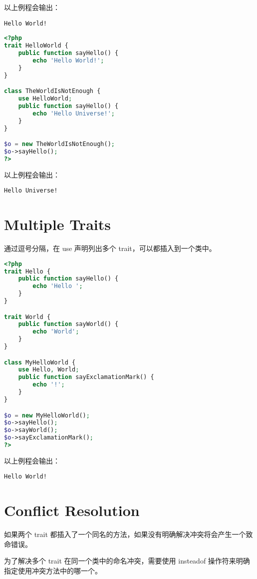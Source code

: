 以上例程会输出：

\begin{verbatim}
Hello World!
\end{verbatim}

\begin{lstlisting}[language=PHP]
<?php
trait HelloWorld {
    public function sayHello() {
        echo 'Hello World!';
    }
}

class TheWorldIsNotEnough {
    use HelloWorld;
    public function sayHello() {
        echo 'Hello Universe!';
    }
}

$o = new TheWorldIsNotEnough();
$o->sayHello();
?>
\end{lstlisting}


以上例程会输出：

\begin{verbatim}
Hello Universe!
\end{verbatim}

\section{Multiple Traits}


通过逗号分隔，在 use 声明列出多个 trait，可以都插入到一个类中。

\begin{lstlisting}[language=PHP]
<?php
trait Hello {
    public function sayHello() {
        echo 'Hello ';
    }
}

trait World {
    public function sayWorld() {
        echo 'World';
    }
}

class MyHelloWorld {
    use Hello, World;
    public function sayExclamationMark() {
        echo '!';
    }
}

$o = new MyHelloWorld();
$o->sayHello();
$o->sayWorld();
$o->sayExclamationMark();
?>
\end{lstlisting}

以上例程会输出：

\begin{verbatim}
Hello World!
\end{verbatim}



\section{Conflict Resolution}

如果两个 trait 都插入了一个同名的方法，如果没有明确解决冲突将会产生一个致命错误。

为了解决多个 trait 在同一个类中的命名冲突，需要使用 insteadof 操作符来明确指定使用冲突方法中的哪一个。

